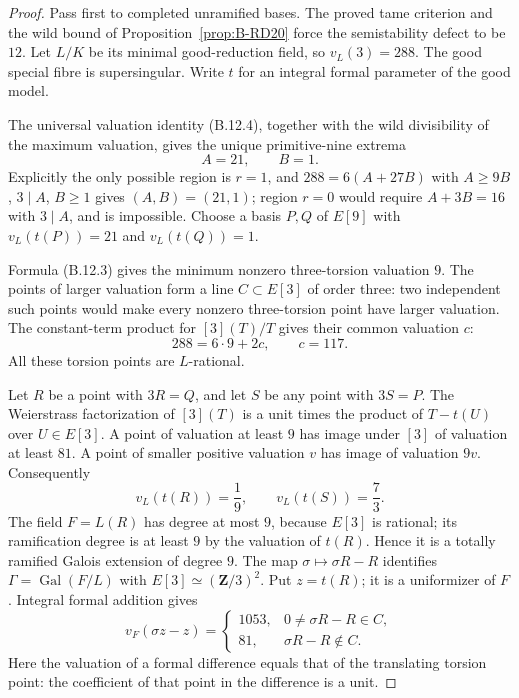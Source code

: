 \begin{proof}
Pass first to completed unramified bases.  The proved tame criterion and the wild bound of Proposition~\ref{prop:B-RD20} force the semistability defect to be $12$.  Let $L/K$ be its minimal good-reduction field, so $v_L(3)=288$.  The good special fibre is supersingular.  Write $t$ for an integral formal parameter of the good model.

The universal valuation identity (B.12.4), together with the wild divisibility of the maximum valuation, gives the unique primitive-nine extrema
\[
                            A=21,\qquad B=1.
\]
Explicitly the only possible region is $r=1$, and
$288=6(A+27B)$ with $A\geq9B$, $3\mid A$, $B\geq1$
gives $(A,B)=(21,1)$; region $r=0$ would require
$A+3B=16$ with $3\mid A$, and is impossible.
Choose a basis $P,Q$ of $E[9]$ with $v_L(t(P))=21$ and $v_L(t(Q))=1$.

Formula (B.12.3) gives the minimum nonzero three-torsion valuation $9$.
The points of larger valuation form a line $C\subset E[3]$ of order three: two independent such points would make every nonzero three-torsion point have larger valuation.  The constant-term product for $[3](T)/T$ gives their common valuation $c$:
\[
                         288=6\cdot9+2c,\qquad c=117.
\]
All these torsion points are $L$-rational.

Let $R$ be a point with $3R=Q$, and let $S$ be any point with $3S=P$.
The Weierstrass factorization of $[3](T)$ is a unit times the product of $T-t(U)$ over $U\in E[3]$.  A point of valuation at least $9$ has image under $[3]$ of valuation at least $81$.  A point of smaller positive valuation $v$ has image of valuation $9v$.  Consequently
\[
                      v_L(t(R))=\frac19,\qquad
                      v_L(t(S))=\frac73.
\]
The field $F=L(R)$ has degree at most $9$, because $E[3]$ is rational; its ramification degree is at least $9$ by the valuation of $t(R)$.  Hence it is a totally ramified Galois extension of degree $9$.
The map $\sigma\mapsto\sigma R-R$ identifies
$\Gamma=\operatorname{Gal}(F/L)$ with $E[3]\simeq(\mathbf Z/3)^2$.
Put $z=t(R)$; it is a uniformizer of $F$.
Integral formal addition gives
\[
 v_F(\sigma z-z)=
 \begin{cases}
 1053,&0\ne\sigma R-R\in C,\\
 81,&\sigma R-R\notin C.
 \end{cases}
\]
Here the valuation of a formal difference equals that of the translating torsion point: the coefficient of that point in the difference is a unit.


\end{proof}
